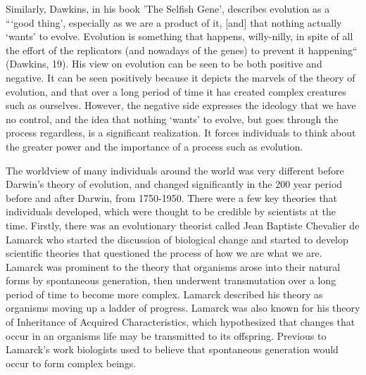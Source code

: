 \documentclass[11pt, oneside]{article}
\begin{document}
\par Similarly, Dawkins, in his book 'The Selfish Gene', describes evolution as a ```good thing', especially as we are a product of it, [and] that nothing actually `wants' to evolve. Evolution is something that happens, willy-nilly, in spite of all the effort of the replicators (and nowadays of the genes) to prevent it happening`` (Dawkins, 19). His view on evolution can be seen to be both positive and negative. It can be seen positively because it depicts the marvels of the theory of evolution, and that over a long period of time it has created  complex creatures such as ourselves. However, the negative side expresses the ideology that we have no control, and the idea that nothing `wants' to evolve, but goes through the process regardless, is a significant realization. It forces individuals to think about the greater power and the importance of a process such as evolution. 

\par The worldview of many individuals around the world was very different before Darwin's theory of evolution, and changed significantly in the 200 year period before and after Darwin, from 1750-1950. There were a few key theories that individuals developed, which were thought to be credible by scientists at the time. Firstly, there was an evolutionary theorist called Jean Baptiste Chevalier de Lamarck who started the discussion of biological change and started to develop scientific theories that questioned the process of how we are what we are. Lamarck was prominent to the theory that organisms arose into their natural forms by spontaneous generation, then underwent transmutation over a long period of time to become more complex. Lamarck described his theory as organisms moving up a ladder of progress. Lamarck was also known for his theory of Inheritance of Acquired Characteristics, which hypothesized that changes that occur in an organisms life may be transmitted to its offspring. Previous to Lamarck's work biologists used to believe that spontaneous generation would occur to form complex beings. 
\end{document}
